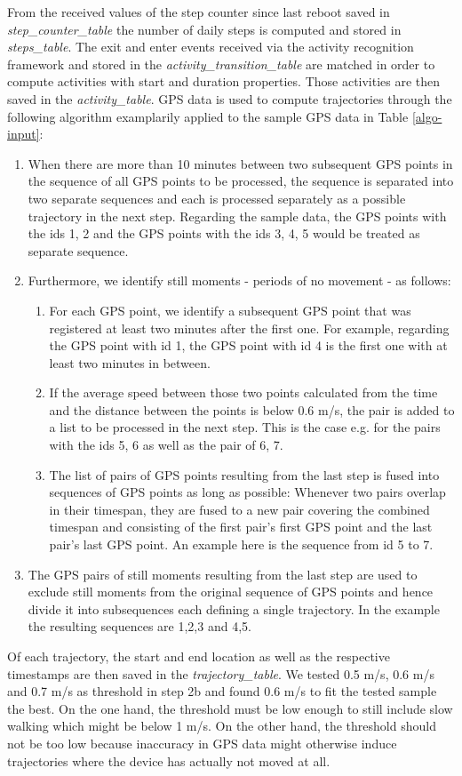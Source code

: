 From the received values of the step counter since last reboot saved in \textit{step\_counter\_table} the number of daily steps is computed and stored in \textit{steps\_table}. The exit and enter events received via the activity recognition framework and stored in the \textit{activity\_transition\_table} are matched in order to compute activities with start and duration properties. Those activities are then saved in the \textit{activity\_table}.
GPS data is used to compute trajectories through the following algorithm examplarily applied to the sample GPS data in Table \ref{algo-input}:
\begin{enumerate}
	\item When there are more than 10 minutes between two subsequent GPS points in the sequence of all GPS points to be processed, the sequence is separated into two separate sequences and each is processed separately as a possible trajectory in the next step. Regarding the sample data, the GPS points with the ids 1, 2 and the GPS points with the ids 3, 4, 5 would be treated as separate sequence.
	\item Furthermore, we identify still moments - periods of no movement - as follows:
	\begin{enumerate}
		\item For each GPS point, we identify a subsequent GPS point that was registered at least two minutes after the first one. For example, regarding the GPS point with id 1, the GPS point with id 4 is the first one with at least two minutes in between.
		\item If the average speed between those two points calculated from the time and the distance between the points is below 0.6 m/s, the pair is added to a list to be processed in the next step. This is the case e.g. for the pairs with the ids 5, 6 as well as the pair of 6, 7.
		\item The list of pairs of GPS points resulting from the last step is fused into sequences of GPS points as long as possible: Whenever two pairs overlap in their timespan, they are fused to a new pair covering the combined timespan and consisting of the first pair's first GPS point and the last pair's last GPS point. An example here is the sequence from id 5 to 7.
	\end{enumerate}
	\item The GPS pairs of still moments resulting from the last step are used to exclude still moments from the original sequence of GPS points and hence divide it into subsequences each defining a single trajectory. In the example the resulting sequences are 1,2,3 and 4,5.
\end{enumerate}
Of each trajectory, the start and end location as well as the respective timestamps are then saved in the \textit{trajectory\_table}. We tested 0.5 m/s, 0.6 m/s and 0.7 m/s as threshold in step 2b and found 0.6 m/s to fit the tested sample the best. On the one hand, the threshold must be low enough to still include slow walking which might be below 1 m/s. On the other hand, the threshold should not be too low because inaccuracy in GPS data might otherwise induce trajectories where the device has actually not moved at all.

